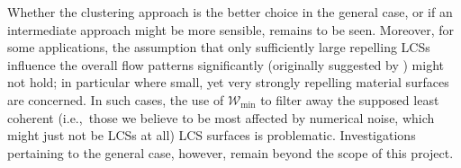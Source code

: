 Whether the clustering approach is the better choice in the general case, or if
an intermediate approach might be more sensible, remains to be seen. Moreover,
for some applications, the assumption that only sufficiently large repelling
LCSs influence the overall flow patterns significantly (originally suggested
by \textcite{farazmand2012computing}) might not hold; in particular where
small, yet very strongly repelling material surfaces are concerned. In such
cases, the use of $\mathcal{W}_{\min}$ to filter away the supposed least
coherent (i.e.,\ those we believe to be most affected by numerical noise, which
might just not be LCSs at all) LCS surfaces is problematic. Investigations
pertaining to the general case, however, remain beyond the scope of this
project.
